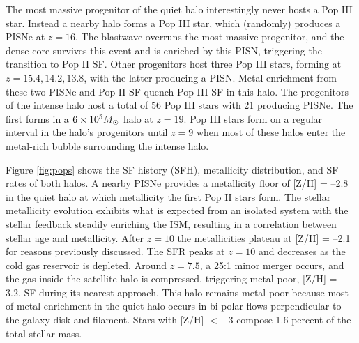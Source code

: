\documentclass[apjl]{emulateapj}
\newcommand{\li}{\noindent$\bullet$\quad}
\newcommand{\Ms}{\ifmmode{M_\odot}\else{$M_\odot$}\fi}
\begin{document}
The most massive progenitor of the quiet halo interestingly never
hosts a Pop III star.  Instead a nearby halo forms a Pop III star,
which (randomly) produces a PISNe at $z=16$.  The blastwave overruns
the most massive progenitor, and the dense core survives this event
and is enriched by this PISN, triggering the transition to Pop II SF.
Other progenitors host three Pop III stars, forming at $z = 15.4,
14.2, 13.8$, with the latter producing a PISN.  Metal enrichment from
these two PISNe and Pop II SF quench Pop III SF in this halo.  The
progenitors of the intense halo host a total of 56 Pop III stars with
21 producing PISNe.  The first forms in a $6 \times 10^5 \Ms$ halo at
$z=19$.  Pop III stars form on a regular interval in the halo's
progenitors until $z=9$ when most of these halos enter the metal-rich
bubble surrounding the intense halo.


Figure \ref{fig:pops} shows the SF history (SFH), metallicity
distribution, and SF rates of both halos.  A nearby PISNe provides a
metallicity floor of [Z/H] = --2.8 in the quiet halo at which
metallicity the first Pop II stars form.  The stellar metallicity
evolution exhibits what is expected from an isolated system with the
stellar feedback steadily enriching the ISM, resulting in a
correlation between stellar age and metallicity.  After $z=10$ the
metallicities plateau at [Z/H] = --2.1 for reasons previously
discussed.  The SFR peaks at $z=10$ and decreases as the cold gas
reservoir is depleted.  Around $z=7.5$, a 25:1 minor merger occurs,
and the gas inside the satellite halo is compressed, triggering
metal-poor, [Z/H] = --3.2, SF during its nearest approach.  This halo
remains metal-poor because most of metal enrichment in the quiet halo
occurs in bi-polar flows perpendicular to the galaxy disk and
filament.  Stars with [Z/H] $<$ --3 compose 1.6 percent of the total
stellar mass.
       
\end{document}
